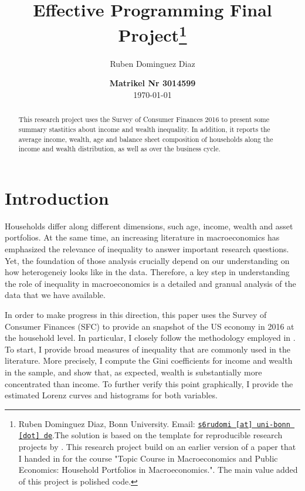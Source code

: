 \documentclass[11pt, a4paper, leqno]{article}
\begin{document}
\title{Effective Programming Final Project\thanks{Ruben Dominguez Diaz, Bonn University. Email: \href{mailto:s6rudomi@uni-bonn.de}{\nolinkurl{s6rudomi [at] uni-bonn [dot] de}}.The solution is based on the template for reproducible research projects by \citet{GaudeckerEconProjectTemplates}. This research project build on an earlier version of a paper that I handed in for the course "Topic Course in Macroeconomics and Public Economics: Household Portfolios in Macroeconomics.". The main value added of this project is polished code.} }

\author{Ruben Dominguez Diaz}

\date{
{\bf Matrikel Nr 3014599} 
\\[1ex] 
\today
}

\maketitle

\begin{abstract}
	This research project uses the Survey of Consumer Finances 2016 to present some summary stastitics about income and wealth inequality. In addition, it reports the average income, wealth, age and balance sheet composition of households along the income and wealth distribution, as well as over the business cycle.
\end{abstract}
\clearpage

\section{Introduction} 
\label{sec:introduction}
    Households differ along different dimensions, such age, income, wealth and asset portfolios. At the same time, an increasing literature in macroeconomics has emphasized the relevance of inequality to answer important research questions. Yet, the foundation of those analysis crucially depend on our understanding on how heterogeneiy looks like in the data. Therefore, a key step in understanding the role of inequality in macroeconomics is a detailed and granual analysis of the data that we have available.

    In order to make progress in this direction, this paper uses the Survey of Consumer Finances (SFC) to provide an snapshot of the US economy in 2016 at the household level. In particular, I closely follow the methodology employed in \citet{Kuhn2016}. To start, I provide broad measures of inequality that are commonly used in the literature. More precisely, I compute the Gini coefficients for income and wealth in the sample, and show that, as expected, wealth is substantially more concentrated than income. To further verify this point graphically, I provide the estimated Lorenz curves and histograms for both variables.
\end{document}
